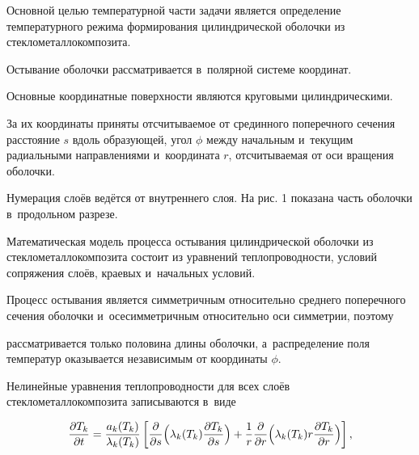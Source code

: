 Основной целью температурной части задачи является определение температурного режима формирования цилиндрической оболочки из стеклометаллокомпозита.



\smallskip




Остывание оболочки рассматривается в~полярной системе координат. 

Основные координатные поверхности являются круговыми цилиндрическими. 

За их координаты приняты отсчитываемое от срединного поперечного сечения расстояние $s$ вдоль образующей, угол $\phi $ между начальным и~текущим радиальными направлениями и~координата $r$, отсчитываемая от оси вращения оболочки. 

Нумерация слоёв ведётся от внутреннего слоя. На рис. 1 показана часть оболочки в~продольном разрезе.















Математическая модель процесса остывания цилиндрической оболочки из стеклометаллокомпозита состоит из уравнений теплопроводности, условий сопряжения слоёв, краевых и~начальных условий.



Процесс остывания является симметричным относительно среднего поперечного сечения оболочки и~осесимметричным относительно оси симметрии, поэтому 

рассматривается только половина длины оболочки, а~распределение поля температур оказывается независимым от координаты $\phi $.



Нелинейные уравнения теплопроводности для всех слоёв стеклометаллокомпозита записываются в~виде

\begin{equation}

\label{pikul:eq1}

\frac{\partial T_k }{\partial t}=\frac{a_k (T_k)}{\lambda _k (T_k)}

\left[ \frac{\partial }{\partial s}\Bigl( \lambda _k (T_k)\frac{\partial T_k }{\partial s} \Bigr)+

\frac{1}{r}\frac{\partial }{\partial r}\Bigl( \lambda _k (T_k)r\frac{\partial T_k }{\partial r} \Bigr) \right],

\end{equation}

